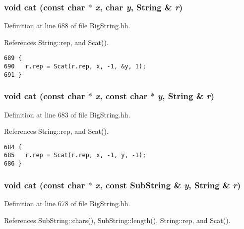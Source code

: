 \subsubsection{\setlength{\rightskip}{0pt plus 5cm}void cat (const char $\ast$ {\em x}, char {\em y}, {\bf String} \& {\em r})\hspace{0.3cm}{\tt  [inline]}}\label{BigString_8hh_a45}




Definition at line 688 of file Big\-String.hh.

References String::rep, and Scat().



\footnotesize\begin{verbatim}689 {
690   r.rep = Scat(r.rep, x, -1, &y, 1);
691 }
\end{verbatim}\normalsize 
{}
\subsubsection{\setlength{\rightskip}{0pt plus 5cm}void cat (const char $\ast$ {\em x}, const char $\ast$ {\em y}, {\bf String} \& {\em r})\hspace{0.3cm}{\tt  [inline]}}\label{BigString_8hh_a44}




Definition at line 683 of file Big\-String.hh.

References String::rep, and Scat().



\footnotesize\begin{verbatim}684 {
685   r.rep = Scat(r.rep, x, -1, y, -1);
686 }
\end{verbatim}\normalsize 
{}
\subsubsection{\setlength{\rightskip}{0pt plus 5cm}void cat (const char $\ast$ {\em x}, const {\bf Sub\-String} \& {\em y}, {\bf String} \& {\em r})\hspace{0.3cm}{\tt  [inline]}}\label{BigString_8hh_a43}




Definition at line 678 of file Big\-String.hh.

References Sub\-String::chars(), Sub\-String::length(), String::rep, and Scat().



